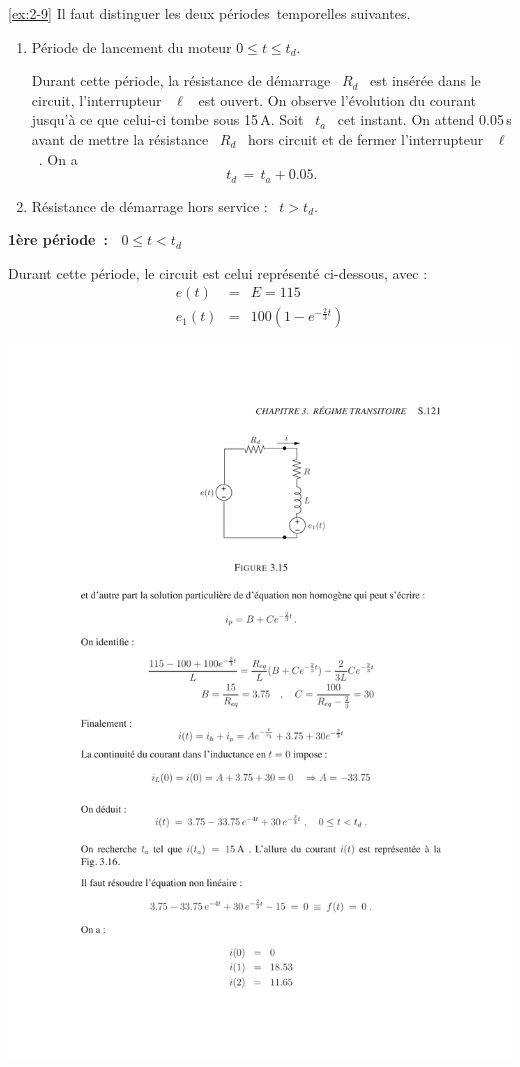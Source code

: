 \begin{solexercise}{\ref{ex:2-9}}
	\label{solex:2-9}
Il faut distinguer les deux p\'eriodes~temporelles suivantes. 
\begin{enumerate}
	\item P\'eriode de lancement du moteur \: $0\leq t \leq t_d$.
	
	Durant cette p\'eriode, la r\'esistance de d\'emarrage \ $R_d$ \ est
	ins\'er\'ee dans le circuit, l'interrupteur \ $\ell$ \ est ouvert.  On
	observe l'\'evolution du courant jusqu'\`a ce que celui-ci tombe sous
	15$\,$A. Soit \ $t_a$ \ cet instant. On attend 0.05$\,$s avant de
	mettre la r\'esistance \ $R_d$ \ hors circuit et de fermer
	l'interrupteur \ $\ell$~. On a
	\[ t_d \, = \, t_a + 0.05. \]           
	\item R\'esistance de d\'emarrage hors service : \ $t>t_d$.
\end{enumerate}
\vspace*{1ex}

{\bf 1\`ere p\'eriode~: \ $0\leq t < t_d$} 

Durant cette p\'eriode, le circuit est celui repr\'esent\'e ci-dessous, avec :
\begin{eqnarray*}
	e(t) &=&E = 115 \\
	e_1(t) &=& 100(1-e^{-\frac{2}{3}t}) 
\end{eqnarray*}
\begin{center}
	\includegraphics[width=\linewidth]{sol_exercices/ex3-9-1}
\end{center}


\end{solexercise}
